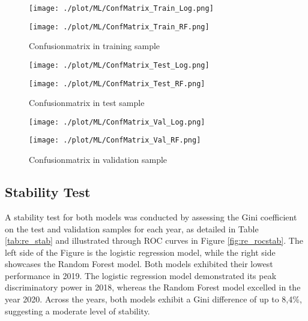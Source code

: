 \begin{figure}[H]
\begin{minipage}{.5\textwidth}
	\centering
	\texttt{[image: ./plot/ML/ConfMatrix\_Train\_Log.png]}
\end{minipage}%
\begin{minipage}{.5\textwidth}
	\centering
	\texttt{[image: ./plot/ML/ConfMatrix\_Train\_RF.png]}
\end{minipage}
    \caption{Confusionmatrix in training sample}
    \label{fig:re_confmatr1}
\end{figure}
\begin{figure}[H]
\begin{minipage}{.5\textwidth}
	\centering
	\texttt{[image: ./plot/ML/ConfMatrix\_Test\_Log.png]}
\end{minipage}%
\begin{minipage}{.5\textwidth}
	\centering
	\texttt{[image: ./plot/ML/ConfMatrix\_Test\_RF.png]}
\end{minipage}
    \caption{Confusionmatrix in test sample}
\end{figure}
\begin{figure}[H]
\begin{minipage}{.5\textwidth}
	\centering
	\texttt{[image: ./plot/ML/ConfMatrix\_Val\_Log.png]}
\end{minipage}%
\begin{minipage}{.5\textwidth}
	\centering
	\texttt{[image: ./plot/ML/ConfMatrix\_Val\_RF.png]}
\end{minipage}
    \caption{Confusionmatrix in validation sample}
    \label{fig:re_confmatr3}
\end{figure}

\subsection{Stability Test}
A stability test for both models was conducted by assessing the Gini coefficient on the test and validation samples for each year, as detailed in Table \ref{tab:re_stab} and illustrated through ROC curves in Figure \ref{fig:re_rocstab}. The left side of the Figure is the logistic regression model, while the right side showcases the Random Forest model. Both models exhibited their lowest performance in 2019. The logistic regression model demonstrated its peak discriminatory power in 2018, whereas the Random Forest model excelled in the year 2020. Across the years, both models exhibit a Gini difference of up to 8,4\%, suggesting a moderate level of stability.

